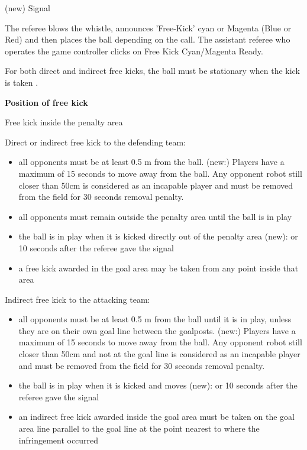 \headlinebox

(new) Signal

The referee blows the whistle, announces 'Free-Kick' cyan or Magenta (Blue or Red) and then  places the ball depending on the call. The assistant referee who operates the game controller clicks on Free Kick Cyan/Magenta Ready. 

For both direct and indirect free kicks, the ball must be stationary when the kick is taken 
.

\bigskip

{\bfseries Position of free kick }

\headlinebox

Free kick inside the penalty area

Direct or indirect free kick to the defending team:

\begin{itemize}
\item all opponents must be at least 0.5 m from the ball. (new:) Players have a maximum of 15 seconds to move away from the ball. Any opponent robot still closer than 50cm is considered as an incapable player and must be removed from the field for 30 seconds removal penalty.
\item all opponents must remain outside the penalty area until the ball is in play
\item the ball is in play when it is kicked directly out of the penalty area (new): or 10 seconds after the referee gave the signal
\item a free kick awarded in the goal area may be taken from any point inside that area
\end{itemize}

\bigskip

Indirect free kick to the attacking team:

\begin{itemize}
\item all opponents must be at least 0.5 m from the ball until it is in play, unless they are on their own goal line between the goalposts. (new:) Players have a maximum of 15 seconds to move away from the ball. Any opponent robot still closer than 50cm and not at the goal line is considered as an incapable player and must be removed from the field for 30 seconds removal penalty.
\item the ball is in play when it is kicked and moves (new): or 10 seconds after the referee gave the signal
\item an indirect free kick awarded inside the goal area must be taken on the goal area line parallel to the goal line at the point nearest to where the infringement occurred
\end{itemize}

